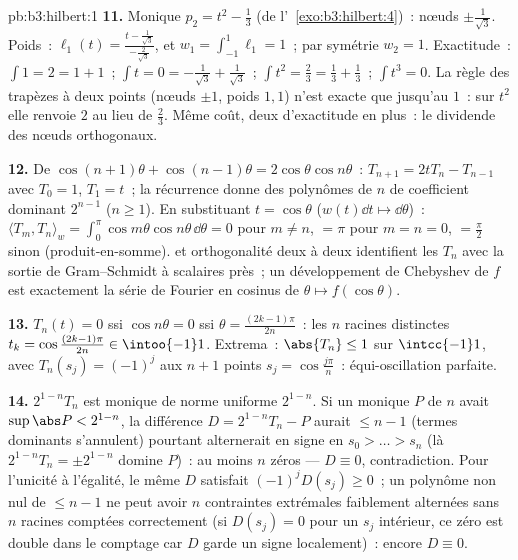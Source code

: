 \begin{solution}{pb:b3:hilbert:1}
\textbf{11.} Monique $p_2 = t^2 - \frac13$ (de
l'~\cref{exo:b3:hilbert:4})~: nœuds $\pm\frac1{\sqrt3}$. Poids~:
$\ell_1(t) = \frac{t - \frac1{\sqrt3}}{-\frac2{\sqrt3}}$, et
$w_1 = \int_{-1}^1\ell_1 = 1$~; par symétrie $w_2 = 1$.
Exactitude~: $\int 1 = 2 = 1 + 1$~; $\int t = 0 =
-\frac1{\sqrt3} + \frac1{\sqrt3}$~; $\int t^2 = \frac23 =
\frac13 + \frac13$~; $\int t^3 = 0$. La règle des trapèzes à
deux points (nœuds $\pm1$, poids $1, 1$) n'est exacte que
jusqu'au  $1$~: sur $t^2$ elle renvoie $2$ au lieu de
$\frac23$. Même coût, deux  d'exactitude en plus~: le
dividende des nœuds orthogonaux.

\textbf{12.} De $\cos(n{+}1)\theta + \cos(n{-}1)\theta =
2\cos\theta\cos n\theta$~: $T_{n+1} = 2tT_n - T_{n-1}$ avec
$T_0 = 1$, $T_1 = t$~; la récurrence donne des polynômes de
 $n$ de coefficient dominant $2^{n-1}$ ($n \geq 1$).
En substituant $t = \cos\theta$ ($w(t)\dd t \mapsto
\dd\theta$)~: $\langle T_m, T_n\rangle_w =
\int_0^\pi\cos m\theta\cos n\theta\,\dd\theta = 0$ pour $m
\neq n$, $= \pi$ pour $m = n = 0$, $= \frac\pi2$ sinon
(produit-en-somme).  et orthogonalité deux à deux
identifient les $T_n$ avec la sortie de Gram--Schmidt à
scalaires près~; un développement de Chebyshev de $f$ est
exactement la série de Fourier en cosinus de $\theta \mapsto
f(\cos\theta)$.

\textbf{13.} $T_n(t) = 0$ ssi $\cos n\theta = 0$ ssi
$\theta = \frac{(2k-1)\pi}{2n}$~: les $n$ racines distinctes
$t_k = \cos\frac{(2k-1)\pi}{2n} \in \intoo{-1}1$. Extrema~:
$\abs{T_n} \leq 1$ sur $\intcc{-1}1$, avec $T_n(s_j) =
(-1)^j$ aux $n + 1$ points $s_j = \cos\frac{j\pi}n$~:
équi-oscillation parfaite.

\textbf{14.} $2^{1-n}T_n$ est monique de norme uniforme
$2^{1-n}$. Si un monique $P$ de  $n$ avait $\sup\abs P <
2^{1-n}$, la différence $D = 2^{1-n}T_n - P$ aurait 
$\leq n - 1$ (termes dominants s'annulent) pourtant
alternerait en signe en $s_0 > \dots > s_n$ (là
$2^{1-n}T_n = \pm2^{1-n}$ domine $P$)~: au moins $n$ zéros
--- $D \equiv 0$, contradiction. Pour l'unicité à
l'égalité, le même $D$ satisfait $(-1)^jD(s_j) \geq 0$~; un
polynôme non nul de  $\leq n-1$ ne peut avoir $n$
contraintes extrémales faiblement alternées sans $n$ racines
comptées correctement (si $D(s_j) = 0$ pour un $s_j$
intérieur, ce zéro est double dans le comptage car $D$ garde
un signe localement)~: encore $D \equiv 0$.


\end{solution}
